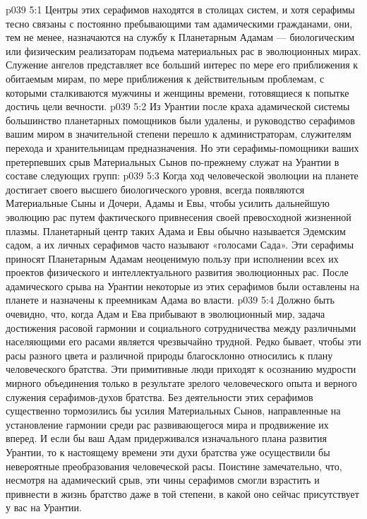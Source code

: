 \vs p039 5:1 Центры этих серафимов находятся в столицах систем, и хотя серафимы тесно связаны с постоянно пребывающими там адамическими гражданами, они, тем не менее, назначаются на службу к Планетарным Адамам --- биологическим или физическим реализаторам подъема материальных рас в эволюционных мирах. Служение ангелов представляет все больший интерес по мере его приближения к обитаемым мирам, по мере приближения к действительным проблемам, с которыми сталкиваются мужчины и женщины времени, готовящиеся к попытке достичь цели вечности.
\vs p039 5:2 Из Урантии после краха адамической системы большинство планетарных помощников были удалены, и руководство серафимов вашим миром в значительной степени перешло к администраторам, служителям перехода и хранительницам предназначения. Но эти серафимы\hyp{}помощники ваших претерпевших срыв Материальных Сынов по\hyp{}прежнему служат на Урантии в составе следующих групп:
\vs p039 5:3 \pc {}\bibnobreakspace {} Когда ход человеческой эволюции на планете достигает своего высшего биологического уровня, всегда появляются Материальные Сыны и Дочери, Адамы и Евы, чтобы усилить дальнейшую эволюцию рас путем фактического привнесения своей превосходной жизненной плазмы. Планетарный центр таких Адама и Евы обычно называется Эдемским садом, а их личных серафимов часто называют «голосами Сада». Эти серафимы приносят Планетарным Адамам неоценимую пользу при исполнении всех их проектов физического и интеллектуального развития эволюционных рас. После адамического срыва на Урантии некоторые из этих серафимов были оставлены на планете и назначены к преемникам Адама во власти.
\vs p039 5:4 \pc {}\bibnobreakspace {} Должно быть очевидно, что, когда Адам и Ева прибывают в эволюционный мир, задача достижения расовой гармонии и социального сотрудничества между различными населяющими его расами является чрезвычайно трудной. Редко бывает, чтобы эти расы разного цвета и различной природы благосклонно относились к плану человеческого братства. Эти примитивные люди приходят к осознанию мудрости мирного объединения только в результате зрелого человеческого опыта и верного служения серафимов\hyp{}духов братства. Без деятельности этих серафимов существенно тормозились бы усилия Материальных Сынов, направленные на установление гармонии среди рас развивающегося мира и продвижение их вперед. И если бы ваш Адам придерживался изначального плана развития Урантии, то к настоящему времени эти духи братства уже осуществили бы невероятные преобразования человеческой расы. Поистине замечательно, что, несмотря на адамический срыв, эти чины серафимов смогли взрастить и привнести в жизнь братство даже в той степени, в какой оно сейчас присутствует у вас на Урантии.
